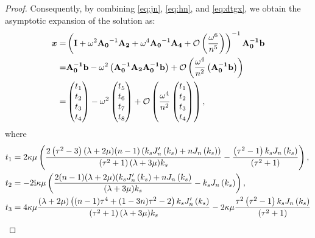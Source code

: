 \documentclass[10pt,a4paper]{amsart}
\begin{document}
\begin{proof}
	
	Consequently, by combining \eqref{eq:jn}, \eqref{eq:hn}, and \eqref{eq:dtgx}, we obtain the asymptotic expansion of the solution as:
	\begin{align}
		\bm{x}=&\left(\mathbf{I}+\omega^2\mathbf{A_0}^{-1}\mathbf{A_2}+\omega^4\mathbf{A_0}^{-1}\mathbf{A_4}+\mathcal{O}\left(\frac{\omega^6}{n^5}\right)\right)^{-1}\mathbf{A_{0}^{-1}b}\notag \\
		=& \mathbf{A_0^{-1}b}-\omega^2\left(\mathbf{A_0^{-1}A_2 A_0^{-1}b}\right)+\mathcal{O}\left(\frac{\omega^4}{n^2}\left(\mathbf{A_0^{-1}b}\right)\right) \notag\\
		=&\begin{pmatrix}t_{1} 
			\\t_{2} 
			\\t_{3} 
			\\t_{4} 	
		\end{pmatrix} -\omega^2\begin{pmatrix}t_{5}
			\\t_{6}
			\\t_{7}
			\\t_{8}		
		\end{pmatrix}+\mathcal{O}\left(\frac{\omega^{4}}{n^2}\begin{pmatrix}t_{1} 
			\\t_{2} 
			\\t_{3} 
			\\t_{4} 
		\end{pmatrix}\right),\notag
	\end{align}
	where
	\begin{align}
		t_{1}&=2 \kappa \mu  \left(\frac{ 2\left(\tau ^2-3\right) (\lambda +2 \mu )(n-1)\left(  k_s J_n'\left(k_s\right)+ n J_n\left(k_s\right)\right) }{\left(\tau ^2+1\right) (\lambda +3 \mu ) k_s} -\frac{ \left(\tau ^2-1\right)  k_s J_n\left(k_s\right)}{\left(\tau ^2+1\right)}\right),\notag\\
		t_{2}&=-2 \mathrm{i} \kappa\mu  \left(\frac{ 2 (n-1) (\lambda +2 \mu ) (k_s J_n'\left(k_s\right)+nJ_n\left(k_s\right)}{(\lambda +3 \mu ) k_s}- k_s J_n\left(k_s\right)\right),\notag\\
		t_{3}&=4 \kappa\mu  \frac{  (\lambda +2 \mu )  \left((n-1) \tau ^4+(1-3 n) \tau ^2-2\right) k_sJ_n'\left(k_s\right)}{\left(\tau ^2+1\right) (\lambda +3 \mu ) k_s}-2 \kappa\mu  \frac{ \tau ^2 \left(\tau ^2-1\right)  k_s J_n\left(k_s\right)}{\left(\tau ^2+1\right) }\notag\\

\end{align}
\end{proof}
\end{document}

